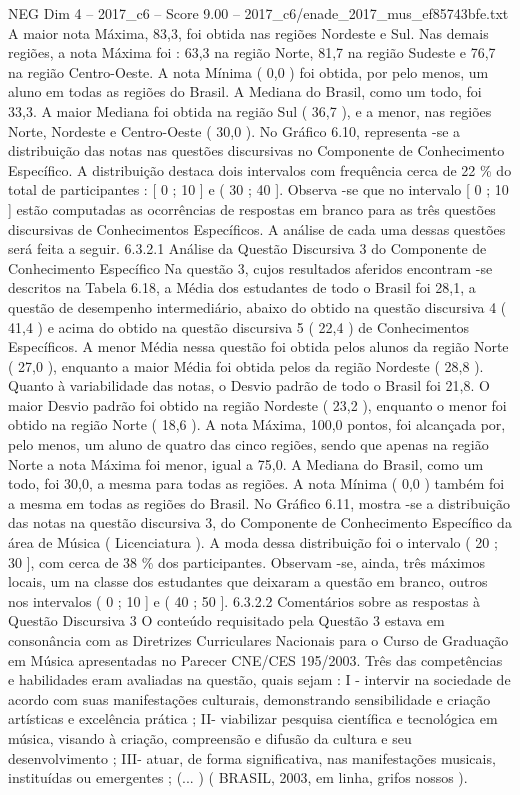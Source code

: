 \begin{textsample}{NEG Dim 4 – 2017\_c6 – Score 9.00 – 2017\_c6/enade\_2017\_mus\_ef85743bfe.txt}
A maior nota Máxima, 83,3, foi obtida nas regiões Nordeste e Sul.
Nas demais regiões, a nota Máxima foi : 63,3 na região Norte, 81,7 na região Sudeste e 76,7 na região Centro-Oeste.
A nota Mínima ( 0,0 ) foi obtida, por pelo menos, um aluno em todas as regiões do Brasil.
A Mediana do Brasil, como um todo, foi 33,3.
A maior Mediana foi obtida na região Sul ( 36,7 ), e a menor, nas regiões Norte, Nordeste e Centro-Oeste ( 30,0 ).
No Gráfico 6.10, representa -se a distribuição das notas nas questões discursivas no Componente de Conhecimento Específico.
A distribuição destaca dois intervalos com frequência cerca de 22 \% do total de participantes : [ 0 ; 10 ] e ( 30 ; 40 ].
Observa -se que no intervalo [ 0 ; 10 ] estão computadas as ocorrências de respostas em branco para as três questões discursivas de Conhecimentos Específicos.
A análise de cada uma dessas questões será feita a seguir. 6.3.2.1 Análise da Questão Discursiva 3 do Componente de Conhecimento Específico Na questão 3, cujos resultados aferidos encontram -se descritos na Tabela 6.18, a Média dos estudantes de todo o Brasil foi 28,1, a questão de desempenho intermediário, abaixo do obtido na questão discursiva 4 ( 41,4 ) e acima do obtido na questão discursiva 5 ( 22,4 ) de Conhecimentos Específicos.
A menor Média nessa questão foi obtida pelos alunos da região Norte ( 27,0 ), enquanto a maior Média foi obtida pelos da região Nordeste ( 28,8 ).
Quanto à variabilidade das notas, o Desvio padrão de todo o Brasil foi 21,8.
O maior Desvio padrão foi obtido na região Nordeste ( 23,2 ), enquanto o menor foi obtido na região Norte ( 18,6 ).
A nota Máxima, 100,0 pontos, foi alcançada por, pelo menos, um aluno de quatro das cinco regiões, sendo que apenas na região Norte a nota Máxima foi menor, igual a 75,0.
A Mediana do Brasil, como um todo, foi 30,0, a mesma para todas as regiões.
A nota Mínima ( 0,0 ) também foi a mesma em todas as regiões do Brasil.
No Gráfico 6.11, mostra -se a distribuição das notas na questão discursiva 3, do Componente de Conhecimento Específico da área de Música ( Licenciatura ).
A moda dessa distribuição foi o intervalo ( 20 ; 30 ], com cerca de 38 \% dos participantes.
Observam -se, ainda, três máximos locais, um na classe dos estudantes que deixaram a questão em branco, outros nos intervalos ( 0 ; 10 ] e ( 40 ; 50 ]. 6.3.2.2 Comentários sobre as respostas à Questão Discursiva 3 O conteúdo requisitado pela Questão 3 estava em consonância com as Diretrizes Curriculares Nacionais para o Curso de Graduação em Música apresentadas no Parecer CNE/CES 195/2003.
Três das competências e habilidades eram avaliadas na questão, quais sejam : I - intervir na sociedade de acordo com suas manifestações culturais, demonstrando sensibilidade e criação artísticas e excelência prática ; II- viabilizar pesquisa científica e tecnológica em música, visando à criação, compreensão e difusão da cultura e seu desenvolvimento ; III- atuar, de forma significativa, nas manifestações musicais, instituídas ou emergentes ; (... ) ( BRASIL, 2003, em linha, grifos nossos ).

\end{textsample}
